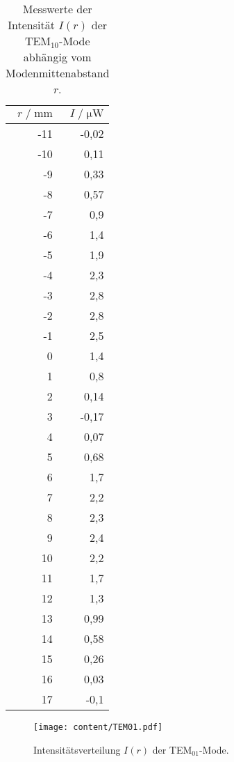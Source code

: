 \begin{table}[H]
  \centering
  \footnotesize
  \caption{Messwerte der Intensität $I(r)$ der TEM$_{10}$-Mode abhängig vom Modenmittenabstand $r$.}
  \label{tab:TEM10}
  \begin{tabular}{r r}
  \toprule
  $r \;/\; \si{\milli\meter}$ & $I \;/\; \si{\micro\watt}$ \\
  \midrule
    -11 & -0,02 \\
    -10 & 0,11  \\
    -9  & 0,33  \\
    -8  & 0,57  \\
    -7  & 0,9   \\
    -6  & 1,4   \\
    -5  & 1,9   \\
    -4  & 2,3   \\
    -3  & 2,8   \\
    -2  & 2,8   \\
    -1  & 2,5   \\
    0   & 1,4   \\
    1   & 0,8   \\
    2   & 0,14  \\
    3   & -0,17 \\
    4   & 0,07  \\
    5   & 0,68  \\
    6   & 1,7   \\
    7   & 2,2   \\
    8   & 2,3   \\
    9   & 2,4   \\
    10  & 2,2   \\
    11  & 1,7   \\
    12  & 1,3   \\
    13  & 0,99  \\
    14  & 0,58  \\
    15  & 0,26  \\
    16  & 0,03  \\
    17  & -0,1  \\
  \bottomrule
  \end{tabular}
\end{table}


\begin{figure}[H]
  \centering
  \texttt{[image: content/TEM01.pdf]}
  \vspace{-10pt}
  \caption{Intensitätsverteilung $I(r)$ der TEM$_{01}$-Mode.}
  \label{fig:TEM01}
\end{figure}


